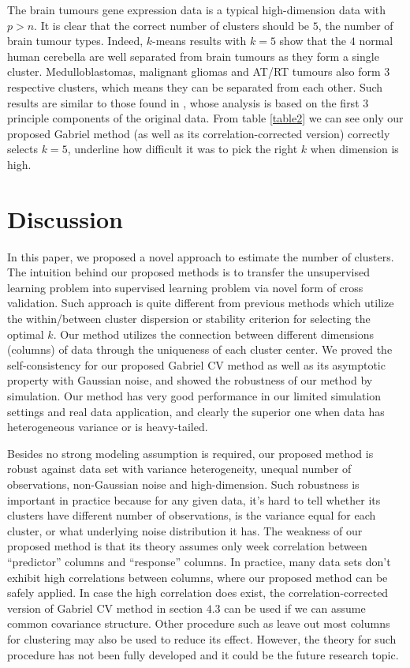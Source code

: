 \documentclass[12pt]{article}
\begin{document}
The brain tumours gene expression data is a typical high-dimension data with $p > n$. It is clear that 
the correct number of clusters should be $5$, the number of brain tumour types. Indeed, $k$-means results with $k=5$ show that the $4$ normal human cerebella are well separated from brain tumours as they form a single cluster.  
Medulloblastomas, malignant gliomas and AT/RT tumours also form $3$ respective clusters, which means they can be separated from each other. Such results are similar to those found in \cite{pomeroy2002prediction}, whose analysis
is based on the first $3$ principle components of the original data.    
From table \ref{table2} we can see only our proposed Gabriel method (as well as its correlation-corrected version) correctly selects $k=5$, underline how difficult it was to pick the right $k$ when dimension is high. 

\section{Discussion}
\label{sec:conc}
In this paper, we proposed a novel approach to estimate the number of
clusters. The intuition behind our proposed methods is to transfer the
unsupervised learning problem into supervised learning problem via novel form
of cross validation. Such approach is quite different from previous methods which 
utilize the within/between cluster dispersion or stability criterion for selecting the 
optimal $k$. Our method utilizes the connection between different dimensions (columns)
of data through the uniqueness of each cluster center. We proved the self-consistency 
for our proposed Gabriel CV method as well as its asymptotic property with Gaussian noise,
and showed the robustness of our method by simulation. Our method has very good performance
in our limited simulation settings and real data application, and clearly the superior
one when data has heterogeneous variance or is heavy-tailed.

Besides no strong modeling assumption is required, our proposed method is robust against data set 
with variance heterogeneity, unequal number of observations, non-Gaussian noise and high-dimension. 
Such robustness is important in practice because for any given data, it's hard to tell whether
its clusters have different number of observations, is the variance equal for each cluster,
or what underlying noise distribution it has. The weakness of our proposed method is 
that its theory assumes only week correlation between ``predictor'' columns and ``response'' 
columns. In practice, many data sets don't exhibit high correlations between columns, where
our proposed method can be safely applied. In case the high correlation does exist, 
the correlation-corrected version of Gabriel CV method in section $4.3$ can be used if we can 
assume common covariance structure. Other procedure such as leave out most columns for clustering 
may also be used to reduce its effect. However, the theory for such procedure has not
been fully developed and it could be the future research topic. 
\end{document}
